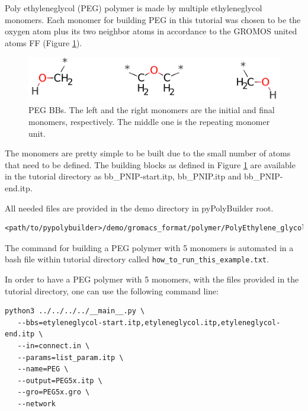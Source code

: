 
Poly ethyleneglycol (PEG) polymer is made by multiple ethyleneglycol monomers.
Each monomer for building PEG in this tutorial was chosen to be the oxygen atom plus its two neighbor atoms in accordance to the GROMOS united atoms FF (Figure \ref{fig:PEGBBs}).

\begin{figure}
    \centering
    \includegraphics[width=\textwidth]{PEG/PEGBBs.png}
    \caption{PEG BBs. The left and the right monomers are the initial and final monomers, respectively.
            The middle one is the repeating monomer unit.}
    \label{fig:PEGBBs}
\end{figure}

The monomers are pretty simple to be built due to the small number of atoms that need to be defined.
The building blocks as defined in Figure \ref{fig:PEGBBs} are available in the tutorial directory as bb\_PNIP-start.itp, bb\_PNIP.itp and bb\_PNIP-end.itp.

All needed files are provided in the demo directory in pyPolyBuilder root.
\begin{lstlisting}
<path/to/pypolybuilder>/demo/gromacs_format/polymer/PolyEthylene_glycol
\end{lstlisting}

The command for building a PEG polymer with 5 monomers is automated in a bash file within tutorial directory called \texttt{how\_to\_run\_this\_example.txt}.

In order to have a PEG polymer with 5 monomers, with the files provided in the tutorial directory, one can use the following command line:

\begin{lstlisting}
python3 ../../../../__main__.py \
   --bbs=etyleneglycol-start.itp,etyleneglycol.itp,etyleneglycol-end.itp \
   --in=connect.in \
   --params=list_param.itp \
   --name=PEG \
   --output=PEG5x.itp \
   --gro=PEG5x.gro \
   --network
\end{lstlisting}


